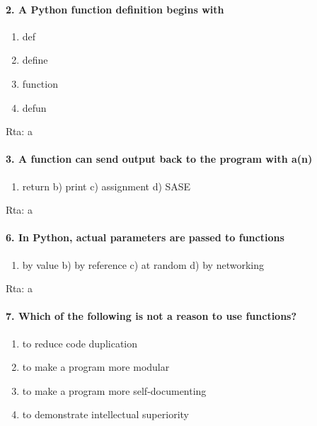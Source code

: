 \documentclass[11pt]{article}
\providecommand{\tightlist}{%
      \setlength{\itemsep}{0pt}\setlength{\parskip}{0pt}}
\begin{document}
    \paragraph{2. A Python function definition begins
with}\label{a-python-function-definition-begins-with}

\begin{enumerate}
\def\labelenumi{\alph{enumi})}
\tightlist
\item
  def
\item
  define
\item
  function
\item
  defun
\end{enumerate}

Rta: a

    \paragraph{3. A function can send output back to the program with
a(n)}\label{a-function-can-send-output-back-to-the-program-with-an}

\begin{enumerate}
\def\labelenumi{\alph{enumi})}
\tightlist
\item
  return b) print c) assignment d) SASE
\end{enumerate}

Rta: a

    \paragraph{6. In Python, actual parameters are passed to
functions}\label{in-python-actual-parameters-are-passed-to-functions}

\begin{enumerate}
\def\labelenumi{\alph{enumi})}
\tightlist
\item
  by value b) by reference c) at random d) by networking
\end{enumerate}

Rta: a

    \paragraph{7. Which of the following is not a reason to use
functions?}\label{which-of-the-following-is-not-a-reason-to-use-functions}

\begin{enumerate}
\def\labelenumi{\alph{enumi})}
\item
  to reduce code duplication
\item
  to make a program more modular
\item
  to make a program more self-documenting
\item
  to demonstrate intellectual superiority
\end{enumerate}
\end{document}
